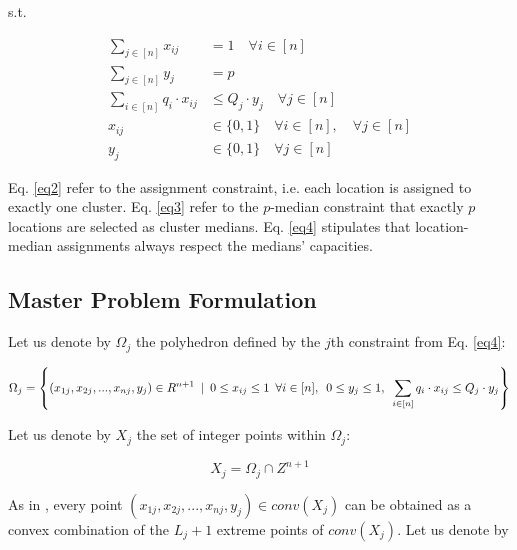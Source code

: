 \documentclass[
	11pt,
	DIV10,
	ngerman,
	a4paper,
	oneside,
	headings=normal,
	captions=tableheading,
	final,
	numbers=noenddot
]{scrartcl}
\begin{document}
s.t.

\begin{align}
	\label{eq2}	\sum_{j \in [n]} x_{ij} &= 1 \quad \forall i \in [n] \\[1em]
	\label{eq3} \sum_{j \in [n]} y_{j} &= p \\[1em]
	\label{eq4} \sum_{i \in [n]} q_{i} \cdot x_{ij} &\leq Q_{j} \cdot y_{j} \quad \forall j \in [n] \\[1em]
	x_{ij} &\in \{0, 1\} \quad \forall i \in [n], \quad \forall j \in [n] \nonumber \\[1em]
	y_{j} &\in \{0, 1\} \quad \forall j \in [n] \nonumber
\end{align}

Eq. \eqref{eq2} refer to the assignment constraint, i.e. each location is assigned to exactly one cluster. Eq. \eqref{eq3} refer to the $ p $-median constraint that exactly $ p $ locations are selected as cluster medians. Eq. \eqref{eq4} stipulates that location-median assignments always respect the medians' capacities.

\subsection{Master Problem Formulation}

Let us denote by $ \Omega_{j} $ the polyhedron defined by the $ j $th constraint from Eq. \eqref{eq4}:

\small

\begin{equation}
	\Omega_{j} = \left\{(x_{1j}, x_{2j}, ..., x_{nj}, y_{j}) \in R^{n + 1} \hspace{0.5em} | \hspace{0.5em} 0 \leq x_{ij} \leq 1 \hspace{0.5em} \forall i \in [n], \hspace{0.5em} 0 \leq y_{j} \leq 1, \hspace{0.5em} \sum_{i \in [n]} q_{i} \cdot x_{ij} \leq Q_{j} \cdot y_{j}\right\} \nonumber
\end{equation}

\normalsize

Let us denote by $ X_{j} $ the set of integer points within $ \Omega_{j} $:

\begin{equation}
	X_{j} = \Omega_{j} \cap Z^{n + 1} \nonumber
\end{equation}

As in \cite{ceselli2005branch}, every point $ (x_{1j}, x_{2j}, ..., x_{nj}, y_{j}) \in conv(X_{j}) $ can be obtained as a convex combination of the $ L_{j} + 1 $ extreme points of $ conv(X_{j}) $. Let us denote by
\end{document}
